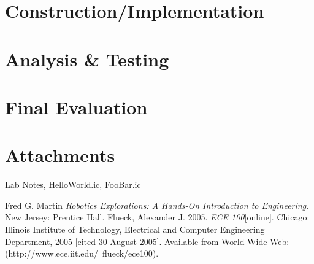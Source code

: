 \documentclass[a4paper, 11pt]{article}
\begin{document}
\section*{Construction/Implementation}
\lipsum[5]

\section*{Analysis \& Testing}
\lipsum[6]

\section*{Final Evaluation}
\lipsum[7]

\section*{Attachments}
Lab Notes, HelloWorld.ic, FooBar.ic

\begin{thebibliography}{9}
 Fred G. Martin \emph{Robotics Explorations: A Hands-On
Introduction to Engineering}. New Jersey: Prentice Hall.
  Flueck, Alexander J. 2005. \emph{ECE 100}[online]. Chicago:
Illinois Institute of Technology, Electrical and Computer Engineering
Department, 2005 [cited 30
August 2005]. Available from World Wide Web:
(http://www.ece.iit.edu/~flueck/ece100).
\end{thebibliography}
\end{document}
